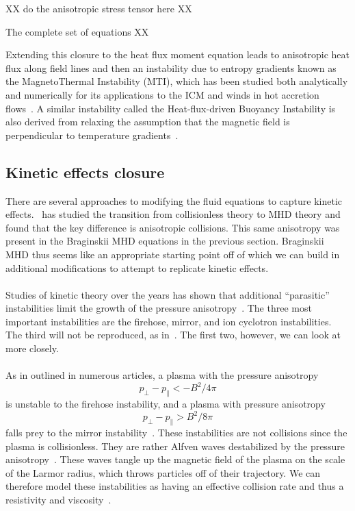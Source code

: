 XX do the anisotropic stress tensor here XX


The complete set of equations XX


Extending this closure to the heat flux moment equation leads to anisotropic heat flux along field lines and then an instability due to entropy gradients known as the MagnetoThermal Instability (MTI), which has been studied both analytically and numerically for its applications to the ICM and winds in hot accretion flows~\cite{KunzBraginskii,Balbus2000,Balbus2001,Kunz2011,Parrish2007,Parrish2005,Johnson2007,Bu2016}. A similar instability called the Heat-flux-driven Buoyancy Instability is also derived from relaxing the assumption that the magnetic field is perpendicular to temperature gradients~\cite{Quataert2008,Parrish2008a,Kunz2011}.

\subsection{Kinetic effects closure}\label{ssec:kinclosure}
There are several approaches to modifying the fluid equations to capture kinetic effects.~\citet{Sharma2003} has studied the transition from collisionless theory to MHD theory and found that the key difference is anisotropic collisions. This same anisotropy was present in the Braginskii MHD equations in the previous section. Braginskii MHD thus seems like an appropriate starting point off of which we can build in additional modifications to attempt to replicate kinetic effects.\\
\\
Studies of kinetic theory over the years has shown that additional ``parasitic'' instabilities limit the growth of the pressure anisotropy~\cite{Sharma2008, Kunz2016}. The three most important instabilities are the firehose, mirror, and ion cyclotron instabilities. The third will not be reproduced, as in~\citet{Sharma2008}. The first two, however, we can look at more closely. \\
\\
As in outlined in numerous articles, a plasma with the pressure anisotropy
\begin{equation}
  p_\perp-p_\parallel<-B^2/4\pi\label{eq:fhthresh}
\end{equation}
is unstable to the firehose instability, and a plasma with pressure anisotropy
\begin{equation}
  p_\perp-p_\parallel >B^2/8\pi \label{eq:mirrorthresh}
\end{equation}
falls prey to the mirror instability~\cite{Kunz2016,Kunz2014,Schekochihin2008,Sharma2008}. These instabilities are not collisions since the plasma is collisionless. They are rather Alfven waves destabilized by the pressure anisotropy~\cite{Sharma2008}. These waves tangle up the magnetic field of the plasma on the scale of the Larmor radius, which throws particles off of their trajectory. We can therefore model these instabilities as having an effective collision rate and thus a resistivity and viscosity~\cite{Schekochihin2008,Kunz2017p}.\\
